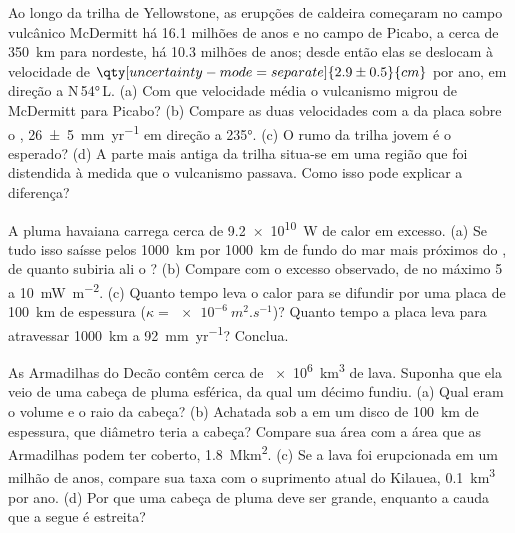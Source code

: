 \begin{exercise}[$\star\star$]\label{exo:b1:hotspots:8}
Ao longo da trilha de Yellowstone, as erupções de caldeira começaram no campo vulcânico McDermitt há 16.1 milhões de anos e no campo de Picabo, a cerca de \qty{350}{km} para nordeste, há 10.3 milhões de anos; desde então elas se deslocam à velocidade de $\qty[uncertainty-mode=separate]{2.9 \pm 0.5}{cm}$ por ano, em direção a
N\,\ang{54}\,L. (a) Com que velocidade média o vulcanismo migrou de McDermitt para Picabo? (b) Compare as duas velocidades com a da placa sobre o , \qty[uncertainty-mode=separate]{26 \pm 5}{mm.yr^{-1}} em direção a \ang{235}. (c) O rumo da trilha jovem é o esperado? (d) A parte mais antiga da trilha situa-se em uma região que foi distendida à medida que o vulcanismo passava. Como isso pode explicar a diferença?
\end{exercise}

\begin{exercise}[$\star\star$]\label{exo:b1:hotspots:9}
A pluma havaiana carrega cerca de \qty{9.2e10}{W} de calor em excesso. (a) Se tudo isso saísse pelos \qty{1000}{km} por \qty{1000}{km} de fundo do mar mais próximos do , de quanto subiria ali o ? (b) Compare com o excesso observado, de no máximo 5 a \qty{10}{mW.m^{-2}}. (c) Quanto tempo leva o calor para se difundir por uma placa de \qty{100}{km} de espessura ($\kappa = \qty{e-6}{m^2.s^{-1}}$)? Quanto tempo a placa leva para atravessar \qty{1000}{km} a \qty{92}{mm.yr^{-1}}? Conclua.
\end{exercise}

\begin{exercise}[$\star\star\star$]\label{exo:b1:hotspots:10}
As Armadilhas do Decão contêm cerca de \qty{e6}{km^3} de lava. Suponha que ela veio de uma cabeça de pluma esférica, da qual um décimo fundiu. (a) Qual eram o volume e o raio da cabeça? (b) Achatada sob a  em um disco de \qty{100}{km} de espessura, que diâmetro teria a cabeça? Compare sua área com a área que as Armadilhas podem ter coberto, \qty{1.8}{\mega km^2}. (c) Se a lava foi erupcionada em um milhão de anos, compare sua taxa com o suprimento atual do Kilauea, \qty{0.1}{km^3} por ano. (d) Por que uma cabeça de pluma deve ser grande, enquanto a cauda que a segue é estreita?
\end{exercise}

